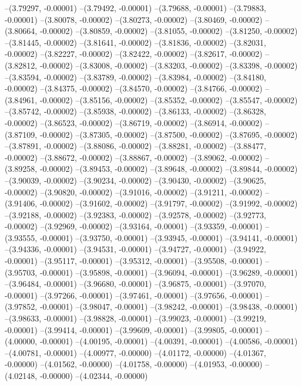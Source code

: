 --(3.79297, -0.00001)
--(3.79492, -0.00001)
--(3.79688, -0.00001)
--(3.79883, -0.00001)
--(3.80078, -0.00002)
--(3.80273, -0.00002)
--(3.80469, -0.00002)
--(3.80664, -0.00002)
--(3.80859, -0.00002)
--(3.81055, -0.00002)
--(3.81250, -0.00002)
--(3.81445, -0.00002)
--(3.81641, -0.00002)
--(3.81836, -0.00002)
--(3.82031, -0.00002)
--(3.82227, -0.00002)
--(3.82422, -0.00002)
--(3.82617, -0.00002)
--(3.82812, -0.00002)
--(3.83008, -0.00002)
--(3.83203, -0.00002)
--(3.83398, -0.00002)
--(3.83594, -0.00002)
--(3.83789, -0.00002)
--(3.83984, -0.00002)
--(3.84180, -0.00002)
--(3.84375, -0.00002)
--(3.84570, -0.00002)
--(3.84766, -0.00002)
--(3.84961, -0.00002)
--(3.85156, -0.00002)
--(3.85352, -0.00002)
--(3.85547, -0.00002)
--(3.85742, -0.00002)
--(3.85938, -0.00002)
--(3.86133, -0.00002)
--(3.86328, -0.00002)
--(3.86523, -0.00002)
--(3.86719, -0.00002)
--(3.86914, -0.00002)
--(3.87109, -0.00002)
--(3.87305, -0.00002)
--(3.87500, -0.00002)
--(3.87695, -0.00002)
--(3.87891, -0.00002)
--(3.88086, -0.00002)
--(3.88281, -0.00002)
--(3.88477, -0.00002)
--(3.88672, -0.00002)
--(3.88867, -0.00002)
--(3.89062, -0.00002)
--(3.89258, -0.00002)
--(3.89453, -0.00002)
--(3.89648, -0.00002)
--(3.89844, -0.00002)
--(3.90039, -0.00002)
--(3.90234, -0.00002)
--(3.90430, -0.00002)
--(3.90625, -0.00002)
--(3.90820, -0.00002)
--(3.91016, -0.00002)
--(3.91211, -0.00002)
--(3.91406, -0.00002)
--(3.91602, -0.00002)
--(3.91797, -0.00002)
--(3.91992, -0.00002)
--(3.92188, -0.00002)
--(3.92383, -0.00002)
--(3.92578, -0.00002)
--(3.92773, -0.00002)
--(3.92969, -0.00002)
--(3.93164, -0.00001)
--(3.93359, -0.00001)
--(3.93555, -0.00001)
--(3.93750, -0.00001)
--(3.93945, -0.00001)
--(3.94141, -0.00001)
--(3.94336, -0.00001)
--(3.94531, -0.00001)
--(3.94727, -0.00001)
--(3.94922, -0.00001)
--(3.95117, -0.00001)
--(3.95312, -0.00001)
--(3.95508, -0.00001)
--(3.95703, -0.00001)
--(3.95898, -0.00001)
--(3.96094, -0.00001)
--(3.96289, -0.00001)
--(3.96484, -0.00001)
--(3.96680, -0.00001)
--(3.96875, -0.00001)
--(3.97070, -0.00001)
--(3.97266, -0.00001)
--(3.97461, -0.00001)
--(3.97656, -0.00001)
--(3.97852, -0.00001)
--(3.98047, -0.00001)
--(3.98242, -0.00001)
--(3.98438, -0.00001)
--(3.98633, -0.00001)
--(3.98828, -0.00001)
--(3.99023, -0.00001)
--(3.99219, -0.00001)
--(3.99414, -0.00001)
--(3.99609, -0.00001)
--(3.99805, -0.00001)
--(4.00000, -0.00001)
--(4.00195, -0.00001)
--(4.00391, -0.00001)
--(4.00586, -0.00001)
--(4.00781, -0.00001)
--(4.00977, -0.00000)
--(4.01172, -0.00000)
--(4.01367, -0.00000)
--(4.01562, -0.00000)
--(4.01758, -0.00000)
--(4.01953, -0.00000)
--(4.02148, -0.00000)
--(4.02344, -0.00000)
